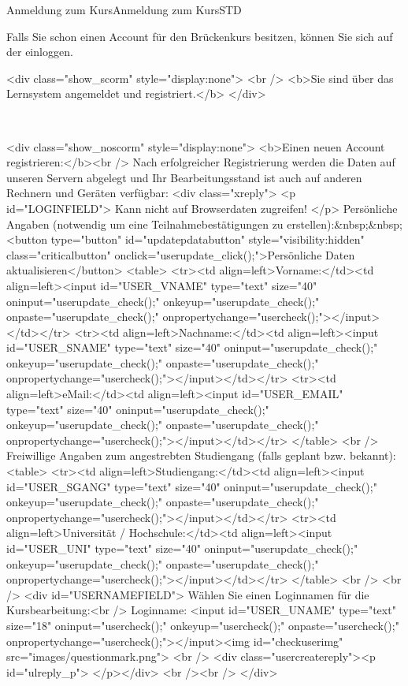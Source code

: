 \begin{MXContent}{Anmeldung zum Kurs}{Anmeldung zum Kurs}{STD}
\MGlobalConfTag
{}

Falls Sie schon einen Account für den Brückenkurs besitzen,
können Sie sich auf der  einloggen.
\begin{html}
<div class="show_scorm" style="display:none">
<br />
<b>Sie sind über das Lernsystem angemeldet und registriert.</b>
</div>
\end{html}
\ \\

\begin{html}
<div class="show_noscorm" style="display:none">
<b>Einen neuen Account registrieren:</b><br />
Nach erfolgreicher Registrierung werden die Daten auf unseren Servern abgelegt
und Ihr Bearbeitungsstand ist auch auf anderen Rechnern und Geräten verfügbar:
<div class="xreply">
<p id="LOGINFIELD">
Kann nicht auf Browserdaten zugreifen!
</p>
Persönliche Angaben (notwendig um eine Teilnahmebestätigungen zu erstellen):&nbsp;&nbsp;<button type="button" id="updatepdatabutton" style="visibility:hidden" class="criticalbutton" onclick="userupdate_click();">Persönliche Daten aktualisieren</button>
<table>
  <tr><td align=left>Vorname:</td><td align=left><input id="USER_VNAME" type="text" size="40" oninput="userupdate_check();" onkeyup="userupdate_check();" onpaste="userupdate_check();" onpropertychange="usercheck();"></input></td></tr>
  <tr><td align=left>Nachname:</td><td align=left><input id="USER_SNAME" type="text" size="40" oninput="userupdate_check();" onkeyup="userupdate_check();" onpaste="userupdate_check();" onpropertychange="usercheck();"></input></td></tr>
  <tr><td align=left>eMail:</td><td align=left><input id="USER_EMAIL" type="text" size="40" oninput="userupdate_check();" onkeyup="userupdate_check();" onpaste="userupdate_check();" onpropertychange="usercheck();"></input></td></tr>
</table>
<br />
Freiwillige Angaben zum angestrebten Studiengang (falls geplant bzw. bekannt):
<table>
  <tr><td align=left>Studiengang:</td><td align=left><input id="USER_SGANG" type="text" size="40" oninput="userupdate_check();" onkeyup="userupdate_check();" onpaste="userupdate_check();" onpropertychange="usercheck();"></input></td></tr>
  <tr><td align=left>Universität / Hochschule:</td><td align=left><input id="USER_UNI" type="text" size="40" oninput="userupdate_check();" onkeyup="userupdate_check();" onpaste="userupdate_check();" onpropertychange="usercheck();"></input></td></tr>
</table>
<br />
<br />
<div id="USERNAMEFIELD">
Wählen Sie einen Loginnamen für die Kursbearbeitung:<br />
Loginname: <input id="USER_UNAME" type="text" size="18" oninput="usercheck();" onkeyup="usercheck();" onpaste="usercheck();" onpropertychange="usercheck();"></input><img id="checkuserimg" src="images/questionmark.png">
<br />
<div class="usercreatereply"><p id="ulreply_p"> </p></div>
<br /><br />
</div>


\end{html}
\end{MXContent}
